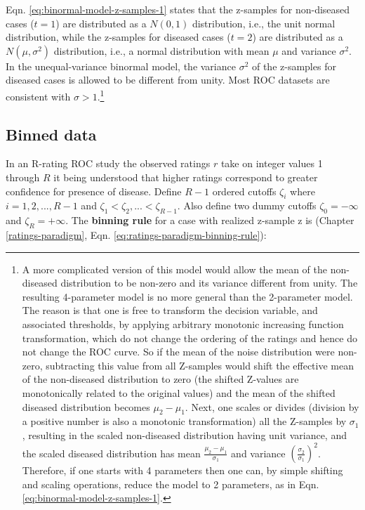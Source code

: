 \documentclass[
]{book}
\begin{document}
Eqn. \eqref{eq:binormal-model-z-samples-1} states that the z-samples for non-diseased cases (\(t = 1\)) are distributed as a \(N(0,1)\) distribution, i.e., the unit normal distribution, while the z-samples for diseased cases (\(t = 2\)) are distributed as a \(N(\mu,\sigma^2)\) distribution, i.e., a normal distribution with mean \(\mu\) and variance \(\sigma^2\). In the unequal-variance binormal model, the variance \(\sigma^2\) of the z-samples for diseased cases is allowed to be different from unity. Most ROC datasets are consistent with \(\sigma > 1\).\footnote{A more complicated version of this model would allow the mean of the non-diseased distribution to be non-zero and its variance different from unity. The resulting 4-parameter model is no more general than the 2-parameter model. The reason is that one is free to transform the decision variable, and associated thresholds, by applying arbitrary monotonic increasing function transformation, which do not change the ordering of the ratings and hence do not change the ROC curve. So if the mean of the noise distribution were non-zero, subtracting this value from all Z-samples would shift the effective mean of the non-diseased distribution to zero (the shifted Z-values are monotonically related to the original values) and the mean of the shifted diseased distribution becomes \(\mu_2-\mu_1\). Next, one scales or divides (division by a positive number is also a monotonic transformation) all the Z-samples by \(\sigma_1\), resulting in the scaled non-diseased distribution having unit variance, and the scaled diseased distribution has mean \(\frac{\mu_2-\mu_1}{\sigma_1}\) and variance \((\frac{\sigma_2}{\sigma_1})^2\). Therefore, if one starts with 4 parameters then one can, by simple shifting and scaling operations, reduce the model to 2 parameters, as in Eqn. \eqref{eq:binormal-model-z-samples-1}.}

\hypertarget{binned-data}{%
\subsection{Binned data}\label{binned-data}}

In an R-rating ROC study the observed ratings \(r\) take on integer values 1 through \(R\) it being understood that higher ratings correspond to greater confidence for presence of disease. Define \(R-1\) ordered cutoffs \(\zeta_i\) where \(i=1,2,...,R-1\) and \(\zeta_1 < \zeta_2,...< \zeta_{R-1}\). Also define two dummy cutoffs \(\zeta_0 = -\infty\) and \(\zeta_R = +\infty\). The \textbf{binning rule} for a case with realized z-sample z is (Chapter \ref{ratings-paradigm}, Eqn. \eqref{eq:ratings-paradigm-binning-rule}):
\end{document}

